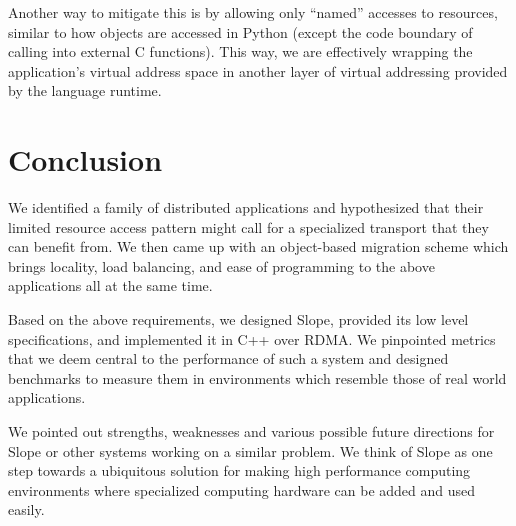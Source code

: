 Another way to mitigate this is by allowing only ``named'' accesses to
resources, similar to how objects are accessed in Python (except the code
boundary of calling into external C functions). This way, we are effectively
wrapping the application's
virtual address space in another layer of virtual addressing provided by the
language runtime.



\section{Conclusion}

We identified a family of distributed applications and hypothesized that
their limited resource access pattern might call for a specialized transport
that they can benefit from. We then came up with an object-based migration
scheme which brings locality, load balancing, and ease of programming to the
above applications all at the same time.

Based on the above requirements, we designed Slope, provided its low level
specifications, and implemented it in C++ over RDMA. We pinpointed metrics that
we deem central to the performance of such a system and designed benchmarks to
measure them in environments which resemble those of real world applications.

We pointed out strengths, weaknesses and various possible future directions for
Slope or other systems working on a similar problem. We think of Slope as one
step towards a ubiquitous solution for making high performance computing
environments where specialized computing hardware can be added and used easily.

